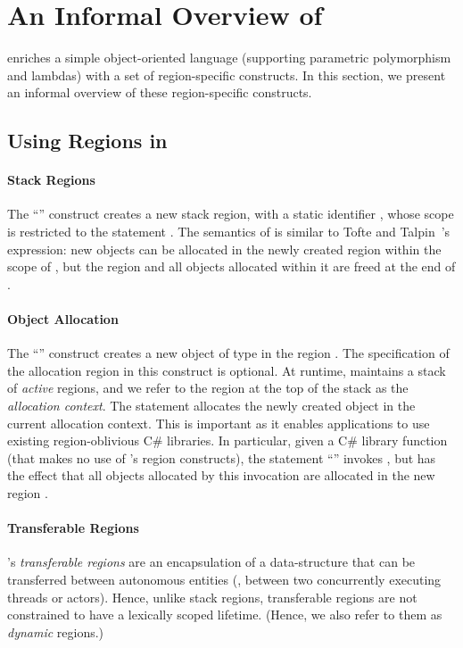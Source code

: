 \newcommand{\COMMENT}[1]{}

\section{An Informal Overview of \name}
\label{sec:overview}

\name enriches a simple object-oriented language (supporting
parametric polymorphism and lambdas) with a set of region-specific constructs. 
In this section, we present an informal overview of these region-specific constructs.

\subsection{Using Regions in \name}

\paragraph{Stack Regions}
The ``'' construct creates a new stack region,
with a static identifier , whose scope is restricted to the
statement . The semantics of   is similar
to Tofte and Talpin~\cite{tofte94}'s  expression:
new objects can be allocated in the newly created region within
the scope of , but the region and all objects allocated within it
are freed at the end of .

\paragraph{Object Allocation}
The ``'' construct creates a new object of type  in
the region . The specification of the allocation region  in
this construct is optional.  At runtime, \name maintains a stack of \emph{active}
regions, and we refer to the region at the top of the stack as the \emph{allocation
context}. The statement  allocates the newly created object in
the current allocation context.
%
This is important as it enables \name applications to use existing region-oblivious
C\# libraries. In particular, given a  C\# library function  (that makes no use of
\name's region constructs), the statement ``'' invokes ,
but has the effect that all objects allocated by this invocation are allocated in the
new region .

\paragraph{Transferable Regions}
\name's \emph{transferable regions} are an encapsulation of a data-structure
that can be transferred between autonomous entities
(\eg, between two concurrently executing threads or actors).
Hence, unlike stack regions, transferable regions are not constrained to have a
lexically scoped lifetime.
(Hence, we also refer to them as \emph{dynamic} regions.)

